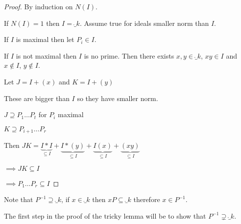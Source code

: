 \documentclass[11pt]{article}
\begin{document}
\begin{proof}
	By induction on $N(I)$.
\spa

	If $N(I) = 1$ then $I =  \ring_k$.
	Assume true for ideals smaller norm than $I$.
	\spa

	If $I$ is maximal then let $P_i \in I$.

	If $I$ is not maximal then $I$ is no prime. Then there exists $x, y \in \ring_k$, $xy \in I$ and $x \not \in I$, $y \not \in I$.
\spa

	Let $J = I + (x) $ and $K = I + (y)$
\spa

These are bigger than $I$ so they have smaller norm.
\spa

$J \supseteq P_1 \dots P_t$ for $P_i$ maximal

	$K \supseteq P_{i+1}\dots P_r$
\spa

	Then $JK = \underbrace{I*I}_{\subseteq I} + \underbrace{I*(y)}_{\subseteq I} + \underbrace{I(x)}_{\subseteq I} + \underbrace{(xy)}_{\subseteq I}$

	\spa

	$\implies JK \subseteq I$

	$\implies P_1\dots P_r \subseteq I$

\end{proof}
\spa
Note that $P^{-1} \supseteq \ring_k$, if $x \in \ring_k$ then $xP \subseteq \ring_k$ therefore $x \in P^{-1}$.

The first step in the proof of the tricky lemma will be to show that $P^{-1} \supsetneq \ring_k$.
\end{document}

